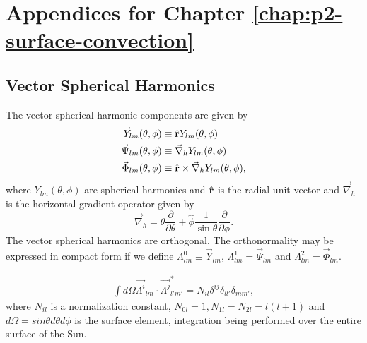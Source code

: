 \chapter{Appendices for Chapter \ref{chap:p2-surface-convection}}
\label{chap:apdx-p2}


\section{Vector Spherical Harmonics}
\label{apdx:p2-vsh}
The vector spherical harmonic components are given by
\begin{align}
 \vec{Y}_{lm}(\theta, \phi) & \equiv \hat{{\mathbf{r}}} Y_{lm}(\theta, \phi) \\
 \vec{\Psi}_{lm}(\theta, \phi) & \equiv \vec{\nabla}_h Y_{lm}(\theta, \phi) \\
 \vec{\Phi}_{lm}(\theta, \phi) & \equiv \hat{{\mathbf{r}}} \times
                                \vec{\nabla}_h Y_{lm}(\theta, \phi),
\end{align}
where $Y_{lm}(\theta, \phi)$ are spherical harmonics and $\hat{{\mathbf{r}}}$ is the
radial unit vector and $\vec{\nabla}_h$ is the horizontal gradient operator
given by
\begin{equation}
 \vec{\nabla}_h = \hat{\theta}\frac{\partial}{\partial \theta}
                + \hat{\phi}\frac{1}{\sin\theta}\frac{\partial }
                {\partial \phi}.
\end{equation}
The vector spherical harmonics are orthogonal. The orthonormality
may be expressed in compact form if we define \(\Lambda^0_{lm}
\equiv \vec{Y}_{lm}\), \(\Lambda^1_{lm} = \vec{\Psi}_{lm}\) and
\(\Lambda^2_{lm} = \vec{\Phi}_{lm}\).

\begin{align}
  \int d\Omega \vec{\Lambda^i}_{lm} \cdot \vec{\Lambda^j}^*_{l'm'}
  = N_{il} \delta^{ij} \delta_{ll'}\delta_{mm'},
\end{align}
where \(N_{il}\) is a normalization constant,
\(N_{0l} = 1, N_{1l} = N_{2l} = l(l+1)\) and
\(d\Omega = sin\theta d\theta d\phi\) is the surface element,
integration being performed over the entire surface of the Sun.

